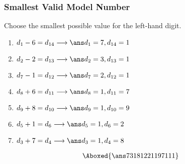 \documentclass{article}
\begin{document}
\subsubsection{Smallest Valid Model Number}
Choose the smallest possible value for the left-hand digit.
\begin{enumerate}
\item{$d_1-6=d_{14}\longrightarrow\ans d_1=7, d_{14}=1$}
\item{$d_2-2=d_{13}\longrightarrow\ans d_2=3, d_{13}=1$}
\item{$d_7-1=d_{12}\longrightarrow\ans d_7=2, d_{12}=1$}
\item{$d_8+6=d_{11}\longrightarrow\ans d_8=1, d_{11}=7$}
\item{$d_9+8=d_{10}\longrightarrow\ans d_9=1, d_{10}=9$}
\item{$d_5+1=d_6\longrightarrow\ans d_5=1, d_6=2$}
\item{$d_3+7=d_4\longrightarrow\ans d_3=1, d_4=8$}
\end{enumerate}
\begin{align*}
\Aboxed{\ans73181221197111}
\end{align*}
\end{document}

